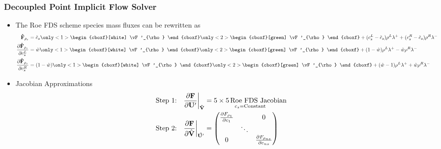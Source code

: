 \documentclass{beamer}
\begin{document}
\begin{frame}
  \frametitle{Decoupled Point Implicit Flow Solver}
  \begin{itemize}
    \item The Roe FDS scheme species mass fluxes can be rewritten as
      \begin{align*}
  	    \Fhat_{\rho_s}
          &= 
        \tilde{c}_s 
        \only<1>{
          \begin{cboxf}[white]
            \vF'_{\rho}
          \end{cboxf}
        }
        \only<2>{
          \begin{cboxf}[green]
            \vF'_{\rho}
          \end{cboxf}
        }
        + (c_s^L-\tilde{c}_s)\rho^L\lambda^+ 
        + (c_s^R-\tilde{c}_s)\rho^R\lambda^- \\
        \pd{\Fhat_{\rho_s}}{c_s^L} 
          &= 
        \roe 
        \only<1>{
          \begin{cboxf}[white]
            \vF'_{\rho}
          \end{cboxf}
        }
        \only<2>{
          \begin{cboxf}[green]
            \vF'_{\rho}
          \end{cboxf}
        }
        + (1-\roe)\rho^L\lambda^+ - \roe \rho^R\lambda^- \\
        \pd{\Fhat_{\rho_s}}{c_s^R} 
        	&=
        (1-\roe)
        \only<1>{
          \begin{cboxf}[white]
            \vF'_{\rho}
          \end{cboxf}
        }
        \only<2>{
          \begin{cboxf}[green]
            \vF'_{\rho}
          \end{cboxf}
        }
        +(\roe-1)\rho^L\lambda^+ + \roe \rho^R\lambda^-
      \end{align*}
    \item Jacobian Approximations
      \begin{align*}
	\text{Step 1:}\quad &
	\frac{\partial \mathbf F}{\partial \mathbf U'}\bigg|_{\mathbf{\hat{V}}} =
	\underset{c_s = \text{Constant}}{5 \times 5\,\text{Roe FDS Jacobian}} \\
	\text{Step 2:}\quad & 
	\frac{\partial \mathbf F}{\partial \hat{\mathbf V}}\bigg|_{\mathbf{\hat{U'}}} = 
        \begin{pmatrix} 
          \frac{\partial F_{\rho_1}}{\partial c_1} & & 0
          \\ & \ddots &  \\ 0 & & \frac{\partial F_{\rho_{ns}}}{\partial c_{ns}}
        \end{pmatrix} 
      \end{align*}
  \end{itemize}
\end{frame}
\end{document}
